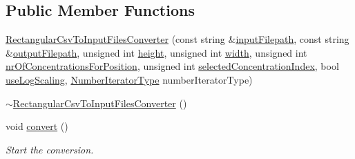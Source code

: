\subsection*{Public Member Functions}
\begin{DoxyCompactItemize}
\item 
\hyperlink{classmultiscale_1_1video_1_1RectangularCsvToInputFilesConverter_a7c0f23d2937406a81a0ed04abf2ef9d3}{Rectangular\-Csv\-To\-Input\-Files\-Converter} (const string \&\hyperlink{classmultiscale_1_1video_1_1RectangularCsvToInputFilesConverter_a407e3c2607f036d531445e22454a910e}{input\-Filepath}, const string \&\hyperlink{classmultiscale_1_1video_1_1RectangularCsvToInputFilesConverter_a2bb6a802fac9b0928bc53a8c71a1c33c}{output\-Filepath}, unsigned int \hyperlink{classmultiscale_1_1video_1_1RectangularCsvToInputFilesConverter_a766bc7eea1c602f46a4a6c0948464c8a}{height}, unsigned int \hyperlink{classmultiscale_1_1video_1_1RectangularCsvToInputFilesConverter_a7fe7f3d014535567fbeb465eb01cde1b}{width}, unsigned int \hyperlink{classmultiscale_1_1video_1_1RectangularCsvToInputFilesConverter_a0bfea1eb0f7dc76deee05af1e2eb744b}{nr\-Of\-Concentrations\-For\-Position}, unsigned int \hyperlink{classmultiscale_1_1video_1_1RectangularCsvToInputFilesConverter_a5143d25a98a097107c2bed748b4d8df0}{selected\-Concentration\-Index}, bool \hyperlink{classmultiscale_1_1video_1_1RectangularCsvToInputFilesConverter_a7739ee04a9340d981896861904022f26}{use\-Log\-Scaling}, \hyperlink{namespacemultiscale_a6ef911f4d48a4bf5e657c237ec169ff5}{Number\-Iterator\-Type} number\-Iterator\-Type)
\item 
\hyperlink{classmultiscale_1_1video_1_1RectangularCsvToInputFilesConverter_ad45bb79ad6c37954376d4f9904872870}{$\sim$\-Rectangular\-Csv\-To\-Input\-Files\-Converter} ()
\item 
void \hyperlink{classmultiscale_1_1video_1_1RectangularCsvToInputFilesConverter_a5872c0ae1f39c52103ed3e62a388f80b}{convert} ()
\begin{DoxyCompactList}\small\item\em Start the conversion. \end{DoxyCompactList}\end{DoxyCompactItemize}
